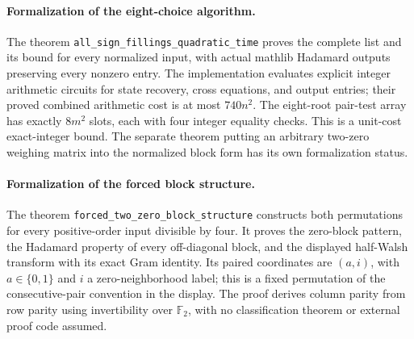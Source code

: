 \paragraph{Formalization of the eight-choice algorithm.} The theorem \texttt{all\_\allowbreak sign\_\allowbreak fillings\_\allowbreak quadratic\_\allowbreak time} proves the complete list and its bound for every normalized input, with actual mathlib Hadamard outputs preserving every nonzero entry. The implementation evaluates explicit integer arithmetic circuits for state recovery, cross equations, and output entries; their proved combined arithmetic cost is at most $740n^2$. The eight-root pair-test array has exactly $8m^2$ slots, each with four integer equality checks. This is a unit-cost exact-integer bound. The separate theorem putting an arbitrary two-zero weighing matrix into the normalized block form has its own formalization status.

\paragraph{Formalization of the forced block structure.} The theorem \texttt{forced\_\allowbreak two\_\allowbreak zero\_\allowbreak block\_\allowbreak structure} constructs both permutations for every positive-order input divisible by four. It proves the zero-block pattern, the Hadamard property of every off-diagonal block, and the displayed half-Walsh transform with its exact Gram identity. Its paired coordinates are $(a,i)$, with $a\in\{0,1\}$ and $i$ a zero-neighborhood label; this is a fixed permutation of the consecutive-pair convention in the display. The proof derives column parity from row parity using invertibility over $\mathbb F_2$, with no classification theorem or external proof code assumed.
